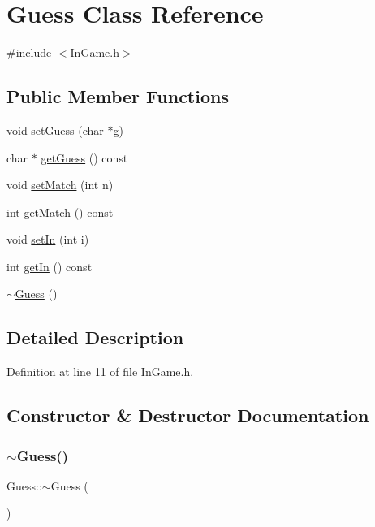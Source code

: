 \hypertarget{class_guess}{}\section{Guess Class Reference}
\label{class_guess}


{\ttfamily \#include $<$In\+Game.\+h$>$}

\subsection*{Public Member Functions}
\begin{DoxyCompactItemize}
\item 
void \hyperlink{class_guess_aca22edff1487c55b4263200c91054391}{set\+Guess} (char $\ast$g)
\item 
char $\ast$ \hyperlink{class_guess_a1dee40f37057ed976a81cfdd2a6c339d}{get\+Guess} () const
\item 
void \hyperlink{class_guess_ac6400624eae122be1613ee38b3f5d10f}{set\+Match} (int n)
\item 
int \hyperlink{class_guess_aff08c12fd1bd55b14cd9d7683a7c5b06}{get\+Match} () const
\item 
void \hyperlink{class_guess_af7ede3729694ebe311a5fe8d5eade9be}{set\+In} (int i)
\item 
int \hyperlink{class_guess_ad3041838f2be39598a9ccbe29ae610cc}{get\+In} () const
\item 
\hyperlink{class_guess_a2de06e7ded6b51cee495e0481ad20c21}{$\sim$\+Guess} ()
\end{DoxyCompactItemize}


\subsection{Detailed Description}


Definition at line 11 of file In\+Game.\+h.



\subsection{Constructor \& Destructor Documentation}
\hypertarget{class_guess_a2de06e7ded6b51cee495e0481ad20c21}{}\label{class_guess_a2de06e7ded6b51cee495e0481ad20c21} 
\subsubsection{\texorpdfstring{$\sim$\+Guess()}{~Guess()}}
{\footnotesize\ttfamily Guess\+::$\sim$\+Guess (\begin{DoxyParamCaption}{ }\end{DoxyParamCaption})\hspace{0.3cm}{\ttfamily [inline]}}



